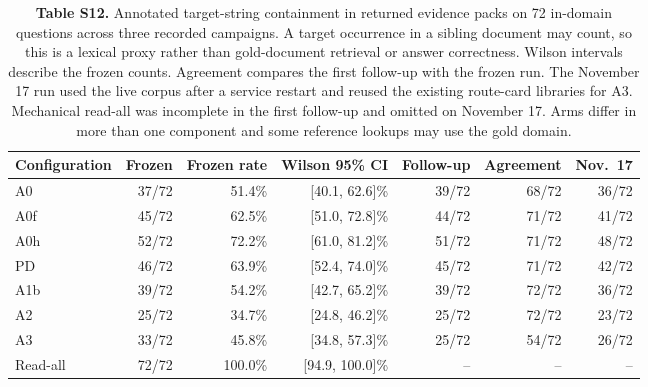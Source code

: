\begin{table}
\centering\small
\caption{\textbf{Table S12.} Annotated target-string containment in returned evidence packs on 72
in-domain questions across three recorded campaigns. A target
occurrence in a sibling document may count, so this is a lexical proxy rather
than gold-document retrieval or answer correctness. Wilson intervals describe
the frozen counts. Agreement compares the first follow-up with the frozen
run. The November 17 run used the live corpus after a service restart and
reused the existing route-card libraries for A3. Mechanical read-all was
incomplete in the first follow-up and omitted on November 17. Arms
differ in more than one component and some reference lookups may use the gold
domain.}

\begin{tabular}{lrrrrrr}
\toprule
Configuration & Frozen & Frozen rate & Wilson 95\% CI & Follow-up & Agreement & Nov.\ 17 \\
\midrule
A0 & 37/72 & 51.4\% & [40.1, 62.6]\% & 39/72 & 68/72 & 36/72 \\
A0f & 45/72 & 62.5\% & [51.0, 72.8]\% & 44/72 & 71/72 & 41/72 \\
A0h & 52/72 & 72.2\% & [61.0, 81.2]\% & 51/72 & 71/72 & 48/72 \\
PD & 46/72 & 63.9\% & [52.4, 74.0]\% & 45/72 & 71/72 & 42/72 \\
A1b & 39/72 & 54.2\% & [42.7, 65.2]\% & 39/72 & 72/72 & 36/72 \\
A2 & 25/72 & 34.7\% & [24.8, 46.2]\% & 25/72 & 72/72 & 23/72 \\
A3 & 33/72 & 45.8\% & [34.8, 57.3]\% & 25/72 & 54/72 & 26/72 \\
Read-all & 72/72 & 100.0\% & [94.9, 100.0]\% & -- & -- & -- \\
\bottomrule
\end{tabular}
\end{table}
